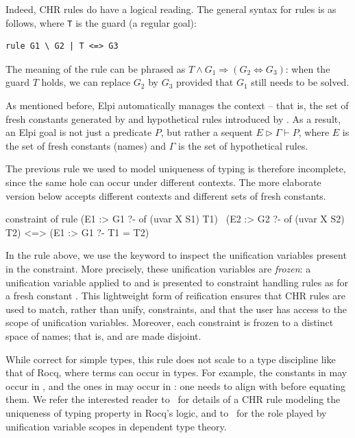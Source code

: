 \documentclass[a4paper, 11pt]{book}
\begin{document}
Indeed, CHR rules do have a logical reading. The general syntax for rules is
as follows, where \texttt{T} is the guard (a regular goal):

\begin{verbatim}
rule G1 \ G2 | T <=> G3
\end{verbatim}

\noindent
The meaning of the rule can be phrased as $T \land G_1 \Rightarrow (G_2
\Leftrightarrow G_3)$: when the guard $T$ holds, we can replace $G_2$ by $G_3$
provided that $G_1$ still needs to be solved.

As mentioned before, Elpi automatically manages the context -- that is, the set
of fresh constants generated by  and hypothetical rules introduced by
\elpi{=>}. As a result, an Elpi goal is not just a predicate $P$, but rather a
sequent $E \triangleright  \Gamma \vdash P$, where $E$ is the set of fresh
constants (names) and $\Gamma$ is the set of hypothetical rules.

The previous rule we used to model uniqueness of typing is therefore incomplete,
since the same hole can occur under different contexts. The more elaborate
version below accepts different contexts and different sets of fresh constants.


\begin{elpicode}
constraint of {
  rule (E1 :> G1 ?- of (uvar X S1) T1)
     \ (E2 :> G2 ?- of (uvar X S2) T2)
   <=> (E1 :> G1 ?- T1 = T2)
}
\end{elpicode}

\noindent
In the rule above, we use the keyword  to inspect the unification
variables present in the constraint. More precisely, these unification
variables are \emph{frozen}: a unification variable  applied to
 and  is presented to constraint handling rules as
 for a fresh constant . This lightweight form of
reification ensures that CHR rules are used to match, rather than unify,
constraints, and that the user has access to the scope of unification
variables. Moreover, each constraint is frozen to a distinct space of names;
that is,  and  are made disjoint.


While correct for simple types, this rule does not scale to a type
discipline like that of Rocq, where terms can occur in types. For example,
the constants in  may occur in , and the
ones in  may occur in : one needs to align 
with  before equating them.
We refer the interested reader to~\cite{TASSI_2019} for details of a CHR rule modeling
the uniqueness of typing property in Rocq's logic, and to~\cite{Jojgov} for
the role played by unification variable scopes in dependent type theory.
\end{document}
